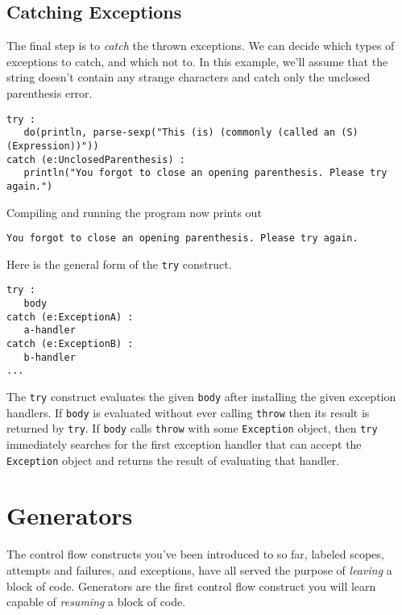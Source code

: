 \documentclass[10pt,oneside]{book}
\begin{document}
\subsection*{Catching Exceptions}
The final step is to {\em catch} the thrown exceptions. We can decide which types of exceptions to catch, and which not to. In this example, we'll assume that the string doesn't contain any strange characters and catch only the unclosed parenthesis error.
\begin{lstlisting}
try :
   do(println, parse-sexp("This (is) (commonly (called an (S) (Expression))"))
catch (e:UnclosedParenthesis) :
   println("You forgot to close an opening parenthesis. Please try again.")
\end{lstlisting}
Compiling and running the program now prints out
\begin{lstlisting}
You forgot to close an opening parenthesis. Please try again.
\end{lstlisting}

Here is the general form of the \texttt{\frenchspacing try} construct.
\begin{lstlisting}
try :
   body
catch (e:ExceptionA) :
   a-handler
catch (e:ExceptionB) :
   b-handler
...   
\end{lstlisting}
The \texttt{\frenchspacing try} construct evaluates the given \texttt{\frenchspacing body} after installing the given exception handlers. If \texttt{\frenchspacing body} is evaluated without ever calling \texttt{\frenchspacing throw} then its result is returned by \texttt{\frenchspacing try}. If \texttt{\frenchspacing body} calls \texttt{\frenchspacing throw} with some \texttt{\frenchspacing Exception} object, then \texttt{\frenchspacing try} immediately searches for the first exception handler that can accept the \texttt{\frenchspacing Exception} object and returns the result of evaluating that handler. 

\section{Generators}
The control flow constructs you've been introduced to so far, labeled scopes, attempts and failures, and exceptions, have all served the purpose of {\em leaving} a block of code. Generators are the first control flow construct you will learn capable of {\em resuming} a block of code. 
\end{document}
